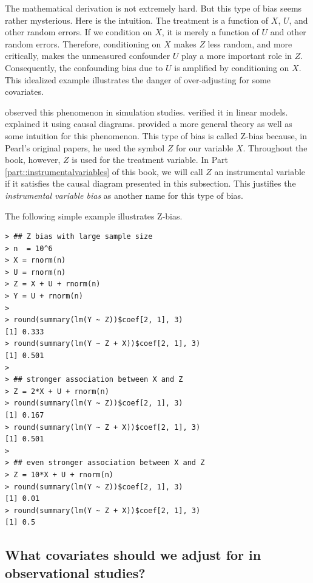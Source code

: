 The mathematical derivation is not extremely hard. But this type of bias seems rather mysterious. Here is the intuition. The treatment is a function of $X$, $U$, and other random errors. If we condition on $X$, it is merely a function of  $U$ and other random errors. Therefore, conditioning on $X$ makes $Z$ less random, and more critically, makes the unmeasured confounder $U$ play a more important role in $Z$. Consequently, the confounding bias due to $U$ is amplified by conditioning on $X$. This idealized example illustrates the danger of over-adjusting for some covariates. 



 \citet{heckman2004using} observed this phenomenon in simulation studies. 
 \citet[][technical report in 2006]{wooldridge2009should} verified it in linear models. 
 \citet{pearl2010class, pearl2011invited} explained it using causal diagrams. 
 \citet{ding2017instrumental} provided a more general theory as well as some intuition for this phenomenon. 
 This type of bias is called Z-bias because, in Pearl's original papers, he used the symbol $Z$ for our variable $X$. Throughout the book, however, $Z$ is used for the treatment variable. In Part \ref{part::instrumentalvariables} of this book,  we will call $Z$ an instrumental variable if it satisfies the causal diagram presented in this subsection. This justifies the {\it instrumental variable bias} as another name for this type of bias. 



The following simple example illustrates Z-bias.
\begin{lstlisting}
> ## Z bias with large sample size
> n  = 10^6
> X = rnorm(n)
> U = rnorm(n)
> Z = X + U + rnorm(n)
> Y = U + rnorm(n)
> 
> round(summary(lm(Y ~ Z))$coef[2, 1], 3)
[1] 0.333
> round(summary(lm(Y ~ Z + X))$coef[2, 1], 3)
[1] 0.501
> 
> ## stronger association between X and Z
> Z = 2*X + U + rnorm(n)
> round(summary(lm(Y ~ Z))$coef[2, 1], 3)
[1] 0.167
> round(summary(lm(Y ~ Z + X))$coef[2, 1], 3)
[1] 0.501
> 
> ## even stronger association between X and Z
> Z = 10*X + U + rnorm(n)
> round(summary(lm(Y ~ Z))$coef[2, 1], 3)
[1] 0.01
> round(summary(lm(Y ~ Z + X))$coef[2, 1], 3)
[1] 0.5
\end{lstlisting} 


\subsection{What covariates should we adjust for in observational studies?}


